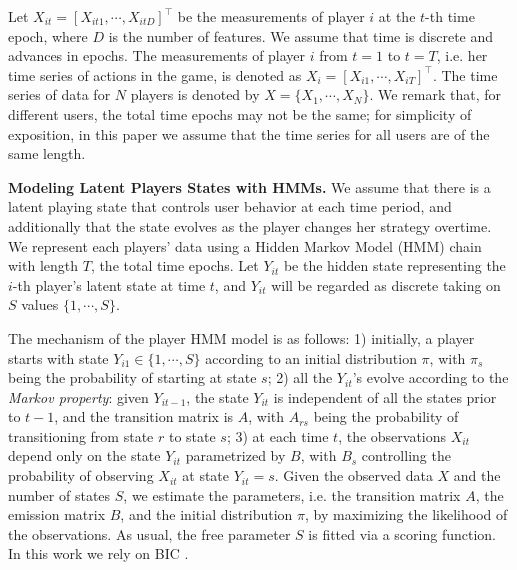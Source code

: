 Let $X_{it} = [X_{it1}, \cdots, X_{itD}]^\top$ be the measurements of player $i$ at the $t$-th time epoch, 
where $D$ is the number of features.  We assume that time is discrete and advances in epochs. 
The measurements of player $i$ from $t = 1$ to  $t = T$, i.e. her time series of actions in the game,  is denoted as $X_{i} = [X_{i1}, \cdots, X_{iT}]^\top$. The time series of data for   $N$ players is denoted by $X = \{ X_1, \cdots, X_N \}$.  We remark that, for different users, the total time epochs may not be the same; for simplicity of exposition, in this paper we assume  
that the time series for all users are of the same length.

{\bf Modeling Latent Players States with HMMs.}
We assume that there is a latent playing state that controls user behavior at each time period, and additionally that the state evolves  as the player changes her strategy overtime.  We represent each players' data using a Hidden Markov Model (HMM) \cite{hmm} chain with length $T$, the total time epochs.  Let $Y_{it}$ be the hidden state representing 
the $i$-th player's  latent state at time $t$, and $Y_{it}$ will be regarded as discrete taking on $S$ values $\{1, \cdots, S\}$. 


The mechanism of the player HMM model is as follows: 1) initially, a player starts with state 
$Y_{i1} \in \{1, \cdots, S\}$ according to an initial distribution $\pi$,  with $\pi_s$ being 
the probability of starting at state $s$; 2) all the $Y_{it}$'s  evolve according to the 
{\it Markov property}: given $Y_{i{t-1}}$, the state $Y_{it}$ is independent of all the 
states prior to $t-1$, and the transition matrix is $A$, with $A_{rs}$ being the probability of 
transitioning from state $r$ to state $s$; 3) at each time $t$, the observations $X_{it}$ 
depend only on the state $Y_{it}$ parametrized by $B$, with $B_s$ controlling the probability 
of observing $X_{it}$ at state $Y_{it} = s$. 
Given the observed data $X$ and the number of states $S$, we  estimate the parameters, i.e. the transition matrix $A$, the emission matrix $B$, and the initial distribution $\pi$, by maximizing the 
likelihood of the observations. As usual, the free parameter $S$ is fitted via a scoring function.  In this work we rely on  BIC \cite{bic}.


